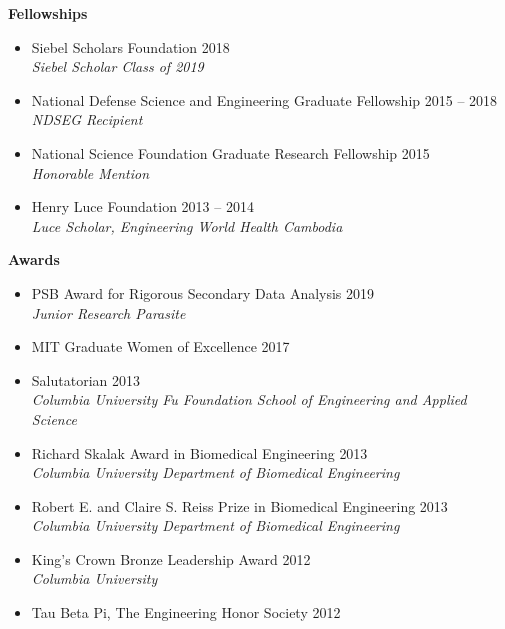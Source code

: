 \documentclass[10pt]{article}
\newenvironment{outerlist}[1][\enskip\textbullet]%
        {\begin{itemize}[#1,leftmargin=*]}{\end{itemize}%
         \vspace{-.6\baselineskip}}
\begin{document}
\textbf{Fellowships}
\begin{outerlist}
	\item[] Siebel Scholars Foundation \hfill {2018} \\
		\textit{Siebel Scholar Class of 2019}
	\item[] National Defense Science and Engineering Graduate Fellowship \hfill {2015 -- 2018} \\
		\textit{NDSEG Recipient}
	\item[] National Science Foundation Graduate Research Fellowship \hfill {2015} \\ 
		\textit{Honorable Mention} 
	\item[] Henry Luce Foundation \hfill {2013 -- 2014} \\ 
		\textit{Luce Scholar, Engineering World Health Cambodia} 
\end{outerlist}
\vspace{.15in}

\textbf{Awards}
\begin{outerlist}
	\item[] PSB Award for Rigorous Secondary Data Analysis \hfill{2019} \\
		\textit{Junior Research Parasite}
	\item[] MIT Graduate Women of Excellence \hfill {2017}
	\item[] Salutatorian \hfill {2013} \\
		\textit{Columbia University Fu Foundation School of Engineering and Applied Science}
	\item[] Richard Skalak Award in Biomedical Engineering \hfill {2013} \\
		\textit{Columbia University Department of Biomedical Engineering}
	\item[] Robert E. and Claire S. Reiss Prize in Biomedical Engineering \hfill {2013} \\
		\textit{Columbia University Department of Biomedical Engineering} 
	\item[] King's Crown Bronze Leadership Award \hfill {2012} \\
		\textit{Columbia University}
	\item[] Tau Beta Pi, The Engineering Honor Society \hfill {2012}
\end{outerlist}

\end{document}
